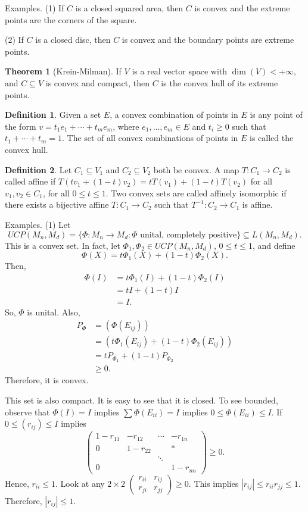 \documentclass[12pt]{article}
\theoremstyle{definition}
\newtheorem*{theorem}{Theorem}
\newtheorem*{definition}{Definition}
\begin{document}
Examples. (1) If $C$ is a closed squared area, then $C$ is convex and the extreme points are the corners of the square.

(2) If $C$ is a closed disc, then $C$ is convex and the boundary points are extreme points.

\begin{theorem}[Krein-Milman]
If $V$ is a real vector space with $\dim(V)<+\infty$, and $C \subseteq V$ is convex and compact, then $C$ is the convex hull of its extreme points.
\end{theorem}

\begin{definition}
Given a set $E$, a convex combination of points in $E$ is any point of the form $v=t_1e_1+\cdots+t_me_m$, where $e_1,\ldots,e_m \in E$ and $t_i \geq 0$ such that $t_1+\cdots+t_m=1$. The set of all convex combinations of points in $E$ is called the convex hull.
\end{definition}

\begin{definition}
Let $C_1 \subseteq V_1$ and $C_2 \subseteq V_2$ both be convex. A map $T:C_1 \to C_2$ is called affine if $T(tv_1+(1-t)v_2)=tT(v_1)+(1-t)T(v_2)$ for all $v_1,v_2 \in C_1$, for all $0 \leq t \leq 1$.
Two convex sets are called affinely isomorphic if there exists a bijective affine $T:C_1 \to C_2$ such that $T^{-1}:C_2 \to C_1$ is affine.
\end{definition}

Examples. (1) Let
\[
UCP(M_n,M_d)=\{\Phi : M_n \to M_d : \Phi \text{ unital, completely positive}\} \subseteq L(M_n,M_d).
\]
This is a convex set. In fact, let $\Phi_1,\Phi_2 \in UCP(M_n,M_d)$, $0 \leq t \leq 1$, and define
\[
\Phi(X)=t\Phi_1(X)+(1-t)\Phi_2(X).
\]
Then,
\begin{align*}
\Phi(I) &= t\Phi_1(I) + (1-t)\Phi_2(I) \\
&= tI + (1-t)I \\
&= I.
\end{align*}
So, $\Phi$ is unital. Also,
\begin{align*}
P_\Phi &= (\Phi(E_{ij})) \\
&= (t\Phi_1(E_{ij}) + (1-t)\Phi_2(E_{ij})) \\
&= tP_{\Phi_1} + (1-t)P_{\Phi_2} \\
&\geq 0.
\end{align*}
Therefore, it is convex.

This set is also compact. It is easy to see that it is closed. To see bounded, observe that $\Phi(I)=I$ implies $\sum \Phi(E_{ii})=I$ implies $0 \leq \Phi(E_{ii}) \leq I$. If $0 \leq (r_{ij}) \leq I$ implies
\[
\begin{pmatrix}1-r_{11} & -r_{12} & \cdots & -r_{1n}\\ 0 & 1-r_{22} & & * \\ & & \ddots & \\ 0 & & & 1-r_{nn}\end{pmatrix} \geq 0.
\]
Hence, $r_{ii} \leq 1$. Look at any $2 \times 2$ $\begin{pmatrix}r_{ii} & r_{ij}\\ r_{ji} & r_{jj}\end{pmatrix} \geq 0$. This implies $|r_{ij}| \leq r_{ii}r_{jj} \leq 1$. Therefore, $|r_{ij}| \leq 1$.
\end{document}
